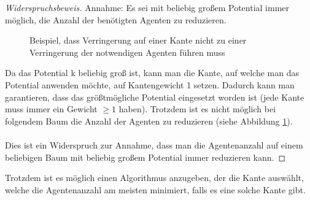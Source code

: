\begin{proof}[Widerspruchsbeweis]
	Annahme: Es sei mit beliebig großem Potential immer möglich, die Anzahl der benötigten Agenten zu reduzieren.
	
	\begin{figure}[hbt]

		\captionsetup{width=0.9\textwidth}
		\caption{Beispiel, dass Verringerung auf einer Kante nicht zu einer Verringerung der notwendigen Agenten führen muss} 
		\label{abb_gegenbeispielMaxPotential}
	\end{figure} 
	
	
	Da das Potential k beliebig groß ist, kann man die Kante, auf welche man das Potential anwenden möchte, auf Kantengewicht 1 setzen. Dadurch kann man garantieren, dass das größtmögliche Potential eingesetzt worden ist (jede Kante muss immer ein Gewicht $\geq 1$ haben). Trotzdem ist es nicht möglich bei folgendem Baum die Anzahl der Agenten zu reduzieren (siehe Abbildung \ref{abb_gegenbeispielMaxPotential}).
	\\
	\\
	Dies ist ein Widerspruch zur Annahme, dass man die Agentenanzahl auf einem beliebigen Baum mit beliebig großem Potential immer reduzieren kann.
\end{proof}

Trotzdem ist es möglich einen Algorithmus anzugeben, der die Kante auswählt, welche die Agentenanzahl am meisten minimiert, falls es eine solche Kante gibt.


